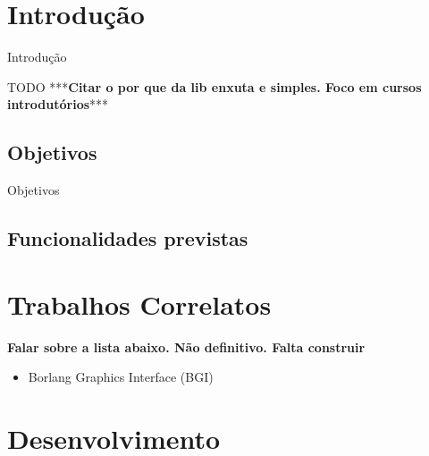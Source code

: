 \documentclass[12pt, %
openright,
oneside, %
a4paper,    %
brazil]{facom-ufu-abntex2}
\begin{document}

\tableofcontents*
\cleardoublepage





\textual



\chapter[Introdução]{Introdução}

Introdução

TODO ***\textbf{Citar o por que da lib enxuta e simples. Foco em cursos introdutórios}***

\section{Objetivos}
Objetivos

\section{Funcionalidades previstas}


\chapter{Trabalhos Correlatos}

\textbf{Falar sobre a lista abaixo. Não definitivo. Falta construir}
\begin{itemize}
    \item Borlang Graphics Interface (BGI)
\end{itemize}

\chapter{Desenvolvimento}
\end{document}
